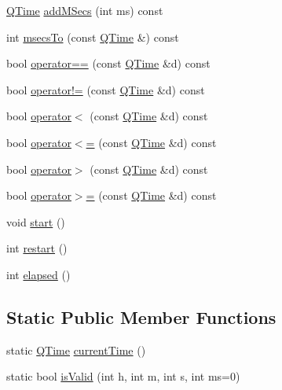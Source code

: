 \begin{DoxyCompactItemize}
\item 
\mbox{\hyperlink{class_q_time}{Q\+Time}} \mbox{\hyperlink{class_q_time_a1b43598c5d992242f13afe4e13a1e59f}{add\+M\+Secs}} (int ms) const
\item 
int \mbox{\hyperlink{class_q_time_acc9338f7c222afcf5cf29d7bb6d40667}{msecs\+To}} (const \mbox{\hyperlink{class_q_time}{Q\+Time}} \&) const
\item 
bool \mbox{\hyperlink{class_q_time_af55053d7624bbd615bcb33d5b50c8457}{operator==}} (const \mbox{\hyperlink{class_q_time}{Q\+Time}} \&d) const
\item 
bool \mbox{\hyperlink{class_q_time_acee0fbf86444e6c7ea66d6f3660fb317}{operator!=}} (const \mbox{\hyperlink{class_q_time}{Q\+Time}} \&d) const
\item 
bool \mbox{\hyperlink{class_q_time_ace31b73f8c2fbdf5bf0547772fd7adc1}{operator$<$}} (const \mbox{\hyperlink{class_q_time}{Q\+Time}} \&d) const
\item 
bool \mbox{\hyperlink{class_q_time_a49da85ecd800447b794f11b2990c228e}{operator$<$=}} (const \mbox{\hyperlink{class_q_time}{Q\+Time}} \&d) const
\item 
bool \mbox{\hyperlink{class_q_time_a9f86ebe31550d3f6d0992459fb3170db}{operator$>$}} (const \mbox{\hyperlink{class_q_time}{Q\+Time}} \&d) const
\item 
bool \mbox{\hyperlink{class_q_time_a32c25cd11888aded5d05c4ac339a3d52}{operator$>$=}} (const \mbox{\hyperlink{class_q_time}{Q\+Time}} \&d) const
\item 
void \mbox{\hyperlink{class_q_time_aafacb3c8da8d383b7e688f6df20c8835}{start}} ()
\item 
int \mbox{\hyperlink{class_q_time_ae4031d9d548cfa663c03d64ac6eb32f6}{restart}} ()
\item 
int \mbox{\hyperlink{class_q_time_ae6223ec2c678edc4c0b4e8b4d51091c8}{elapsed}} ()
\end{DoxyCompactItemize}
\subsection*{Static Public Member Functions}
\begin{DoxyCompactItemize}
\item 
static \mbox{\hyperlink{class_q_time}{Q\+Time}} \mbox{\hyperlink{class_q_time_a39b156ef7067e581f9fd70de6ef9ea4d}{current\+Time}} ()
\item 
static bool \mbox{\hyperlink{class_q_time_ac4290605812fb2c716e443bbe0409f60}{is\+Valid}} (int h, int m, int s, int ms=0)
\end{DoxyCompactItemize}
